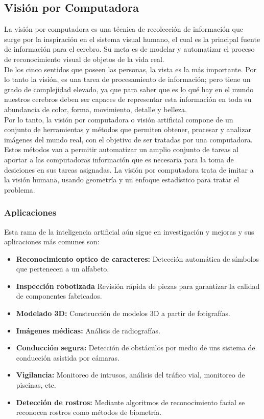 \subsection{Visión por Computadora}
La visión por computadora es una técnica de recolección de información que surge por la inspiración en el sistema visual humano, el cual es la principal fuente de información para el cerebro. Su meta es de modelar y automatizar el proceso de reconocimiento visual de objetos de la vida real.\\

De los cinco sentidos que poseen las personas, la vista es la más importante. Por lo tanto la visión, es una tarea de procesamiento de información; pero tiene un grado de complejidad elevado, ya que para saber que es lo qué hay en el mundo nuestros cerebros deben ser capaces de representar esta información en toda su abundancia de color, forma, movimiento, detalle y belleza. \cite{iaarbook:artificialvision}\\

Por lo tanto, la visión por computadora o visión artificial compone de un conjunto de herramientas y métodos que permiten obtener, procesar y analizar imágenes del mundo real, con el objetivo de ser tratadas por una computadora. Estos métodos van a permitir automatizar un amplio conjunto de tareas al aportar a las computadoras información que es necesaria para la toma de desiciones en sus tareas asignadas. La visión por computadora trata de imitar a la visión humana, usando geometría y un enfoque estadístico para tratar el problema.\\

\subsubsection{Aplicaciones}
Esta rama de la inteligencia artificial aún sigue en investigación y mejoras y sus aplicaciones más comunes son:

\begin{itemize}
    \item \textbf{Reconocimiento optico de caracteres:} Detección automática de símbolos que pertenecen a un alfabeto.
    \item \textbf{Inspección robotizada} Revisión rápida de piezas para garantizar la calidad de componentes fabricados.
    \item \textbf{Modelado 3D:} Construcción de modelos 3D a partir de fotigrafías.
    \item \textbf{Imágenes médicas:} Análisis de radiografías.
    \item \textbf{Conducción segura:} Detección de obstáculos por medio de uns sistema de conducción asistida por cámaras.
    \item \textbf{Vigilancia:} Monitoreo de intrusos, análisis del tráfico vial, monitoreo de piscinas, etc.
    \item \textbf{Detección de rostros:} Mediante algoritmos de reconocimiento facial se reconocen rostros como métodos de biometría.
\end{itemize}

